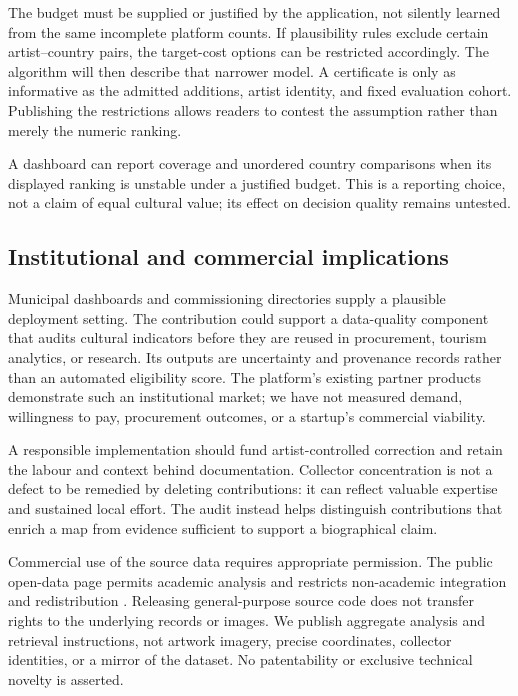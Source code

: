 The budget must be supplied or justified by the application, not silently learned from the same incomplete platform counts. If plausibility rules exclude certain artist--country pairs, the target-cost options can be restricted accordingly. The algorithm will then describe that narrower model. A certificate is only as informative as the admitted additions, artist identity, and fixed evaluation cohort. Publishing the restrictions allows readers to contest the assumption rather than merely the numeric ranking.

A dashboard can report coverage and unordered country comparisons when its displayed ranking is unstable under a justified budget. This is a reporting choice, not a claim of equal cultural value; its effect on decision quality remains untested.

\subsection{Institutional and commercial implications}
Municipal dashboards and commissioning directories supply a plausible deployment setting. The contribution could support a data-quality component that audits cultural indicators before they are reused in procurement, tourism analytics, or research. Its outputs are uncertainty and provenance records rather than an automated eligibility score. The platform's existing partner products demonstrate such an institutional market; we have not measured demand, willingness to pay, procurement outcomes, or a startup's commercial viability.

A responsible implementation should fund artist-controlled correction and retain the labour and context behind documentation. Collector concentration is not a defect to be remedied by deleting contributions: it can reflect valuable expertise and sustained local effort. The audit instead helps distinguish contributions that enrich a map from evidence sufficient to support a biographical claim.

Commercial use of the source data requires appropriate permission. The public open-data page permits academic analysis and restricts non-academic integration and redistribution \cite{sacdata}. Releasing general-purpose source code does not transfer rights to the underlying records or images. We publish aggregate analysis and retrieval instructions, not artwork imagery, precise coordinates, collector identities, or a mirror of the dataset. No patentability or exclusive technical novelty is asserted.

